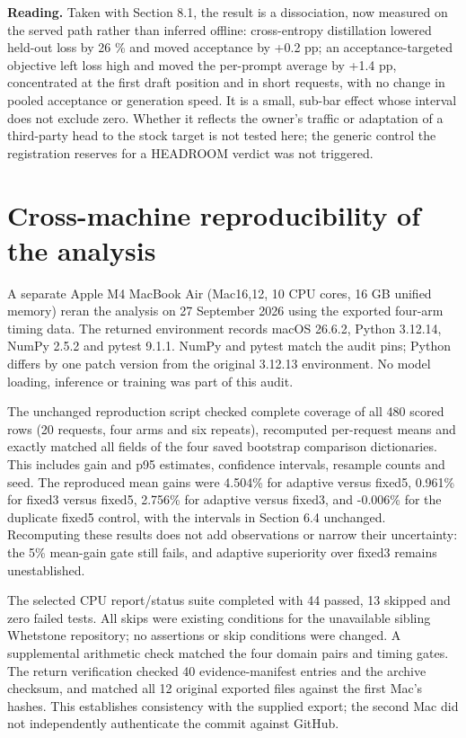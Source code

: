 \documentclass[
  11pt,
]{article}
\begin{document}
\textbf{Reading.} Taken with Section 8.1, the result is a dissociation,
now measured on the served path rather than inferred offline:
cross-entropy distillation lowered held-out loss by 26 \% and moved
acceptance by +0.2 pp; an acceptance-targeted objective left loss high
and moved the per-prompt average by +1.4 pp, concentrated at the first
draft position and in short requests, with no change in pooled
acceptance or generation speed. It is a small, sub-bar effect whose
interval does not exclude zero. Whether it reflects the owner's traffic
or adaptation of a third-party head to the stock target is not tested
here; the generic control the registration reserves for a HEADROOM
verdict was not triggered.

\section{Cross-machine reproducibility of the
analysis}\label{cross-machine-reproducibility-of-the-analysis}

A separate Apple M4 MacBook Air (Mac16,12, 10 CPU cores, 16 GB unified
memory) reran the analysis on 27 September 2026 using the exported
four-arm timing data. The returned environment records macOS 26.6.2,
Python 3.12.14, NumPy 2.5.2 and pytest 9.1.1. NumPy and pytest match the
audit pins; Python differs by one patch version from the original
3.12.13 environment. No model loading, inference or training was part of
this audit.

The unchanged reproduction script checked complete coverage of all 480
scored rows (20 requests, four arms and six repeats), recomputed
per-request means and exactly matched all fields of the four saved
bootstrap comparison dictionaries. This includes gain and p95 estimates,
confidence intervals, resample counts and seed. The reproduced mean
gains were 4.504\% for adaptive versus fixed5, 0.961\% for fixed3 versus
fixed5, 2.756\% for adaptive versus fixed3, and -0.006\% for the
duplicate fixed5 control, with the intervals in Section 6.4 unchanged.
Recomputing these results does not add observations or narrow their
uncertainty: the 5\% mean-gain gate still fails, and adaptive
superiority over fixed3 remains unestablished.

The selected CPU report/status suite completed with 44 passed, 13
skipped and zero failed tests. All skips were existing conditions for
the unavailable sibling Whetstone repository; no assertions or skip
conditions were changed. A supplemental arithmetic check matched the
four domain pairs and timing gates. The return verification checked 40
evidence-manifest entries and the archive checksum, and matched all 12
original exported files against the first Mac's hashes. This establishes
consistency with the supplied export; the second Mac did not
independently authenticate the commit against GitHub.
\end{document}
